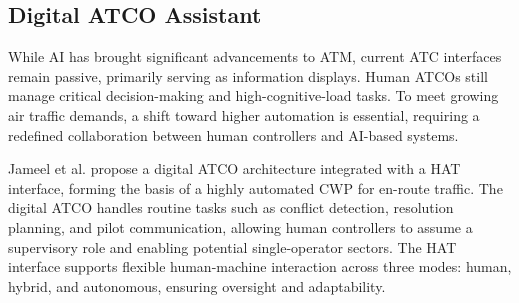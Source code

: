 \subsection{Digital ATCO Assistant}


While \gls{AI} has brought significant advancements to \gls{ATM}, current \gls{ATC} interfaces remain passive, primarily serving as information displays. 
Human \glspl{ATCO} still manage critical decision-making and high-cognitive-load tasks. 
To meet growing air traffic demands, a shift toward higher automation is essential, requiring a redefined collaboration between human controllers and \gls{AI}-based systems.


Jameel et al. \cite{Jameel_2023} propose a digital \gls{ATCO} architecture integrated with a \gls{HAT} interface, forming the basis of a highly automated \gls{CWP} for en-route traffic. 
The digital \gls{ATCO} handles routine tasks such as conflict detection, resolution planning, and pilot communication, allowing human controllers to assume a supervisory role and enabling potential single-operator sectors.
The \gls{HAT} interface supports flexible human-machine interaction across three modes: human, hybrid, and autonomous, ensuring oversight and adaptability.


